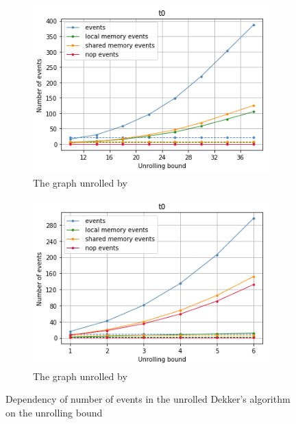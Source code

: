 
\begin{figure}[t]
\begin{subfigure}{.45\textwidth}
\includegraphics[width=\textwidth,keepaspectratio]{img/my/performance/new/new-e.png}
\caption{The graph unrolled by \porthos[2]}
\label{dep:events:new}
\end{subfigure}
\hfill
%
\begin{subfigure}{.45\textwidth}
\includegraphics[width=\textwidth,keepaspectratio]{img/my/performance/new/old-e.png}
\caption{The graph unrolled by \porthos[1]}
\label{dep:events:old}
\end{subfigure}
%
\caption{Dependency of number of events in the unrolled Dekker's algorithm on the unrolling bound}
\label{dep:events}
\end{figure}


